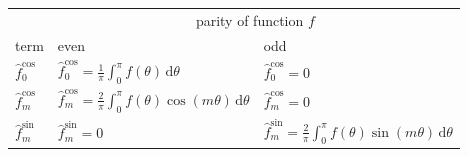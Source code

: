 \begin{table}[htbp]
\centering
\begin{tabular}{l|l|l}
           ~              & \multicolumn{2}{c}{parity of function $f$} \\
         term             & even                                                                                                & odd                          \\
 \hline
 $\hat{f}_0^\mathrm{cos}$ & $\hat{f}_0^\mathrm{cos} = \frac{1}{\pi} \int_{0}^{\pi} f(\theta)                \,\mathrm{d}\theta$ & $\hat{f}_0^\mathrm{cos} = 0$ \\
 $\hat{f}_m^\mathrm{cos}$ & $\hat{f}_m^\mathrm{cos} = \frac{2}{\pi} \int_{0}^{\pi} f(\theta) \cos(m \theta) \,\mathrm{d}\theta$ & $\hat{f}_m^\mathrm{cos} = 0$ \\
 $\hat{f}_m^\mathrm{sin}$ & $\hat{f}_m^\mathrm{sin} = 0$ & $\hat{f}_m^\mathrm{sin} = \frac{2}{\pi} \int_{0}^{\pi} f(\theta) \sin(m \theta) \,\mathrm{d}\theta$
\end{tabular}
\end{table}

